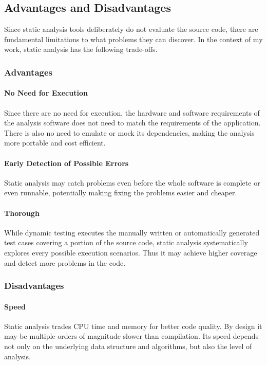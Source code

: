 \subsection{Advantages and Disadvantages}
Since static analysis tools deliberately do not evaluate the source code, there are fundamental limitations to what problems they can discover. In the context of my work, static analysis has the following trade-offs.

\subsubsection{Advantages}
\paragraph{No Need for Execution}
Since there are no need for execution, the hardware and software requirements of the analysis software does not need to match the requirements of the application. There is also no need to emulate or mock its dependencies, making the analysis more portable and cost efficient.

\paragraph{Early Detection of Possible Errors}
Static analysis may catch problems even before the whole software is complete or even runnable, potentially making fixing the problems easier and cheaper.~\cite{xie}

\paragraph{Thorough}
While dynamic testing executes the manually written or automatically generated test cases covering a portion of the source code, static analysis systematically explores every possible execution scenarios. Thus it may achieve higher coverage and detect more problems in the code.~\cite{xie}

\subsubsection{Disadvantages}
\paragraph{Speed} Static analysis trades CPU time and memory for better code quality. By design it may be multiple orders of magnitude slower than compilation. Its speed depends not only on the underlying data structure and algorithms, but also the level of analysis.~\cite{clang}

